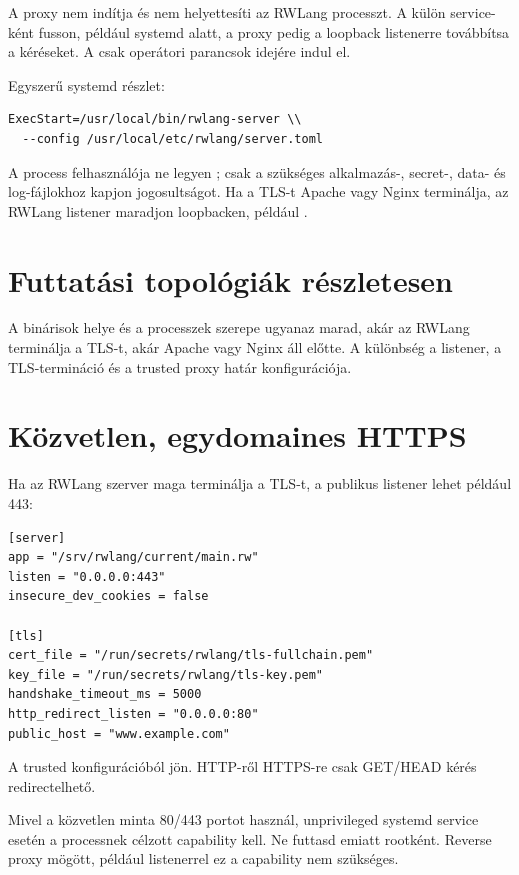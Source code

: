 A proxy nem indítja és nem helyettesíti az RWLang processzt. A  külön service-ként fusson, például systemd alatt, a proxy pedig a loopback listenerre továbbítsa a kéréseket. A  csak operátori parancsok idejére indul el.

Egyszerű systemd  részlet:

\begin{lstlisting}
ExecStart=/usr/local/bin/rwlang-server \\
  --config /usr/local/etc/rwlang/server.toml
\end{lstlisting}

A process felhasználója ne legyen ; csak a szükséges alkalmazás-, secret-, data- és log-fájlokhoz kapjon jogosultságot. Ha a TLS-t Apache vagy Nginx terminálja, az RWLang listener maradjon loopbacken, például .

\section{Futtatási topológiák részletesen}

A binárisok helye és a processzek szerepe ugyanaz marad, akár az RWLang terminálja a TLS-t, akár Apache vagy Nginx áll előtte. A különbség a listener, a TLS-termináció és a trusted proxy határ konfigurációja.

\section{Közvetlen, egydomaines HTTPS}

Ha az RWLang szerver maga terminálja a TLS-t, a publikus listener lehet például 443:

\begin{lstlisting}
[server]
app = "/srv/rwlang/current/main.rw"
listen = "0.0.0.0:443"
insecure_dev_cookies = false

[tls]
cert_file = "/run/secrets/rwlang/tls-fullchain.pem"
key_file = "/run/secrets/rwlang/tls-key.pem"
handshake_timeout_ms = 5000
http_redirect_listen = "0.0.0.0:80"
public_host = "www.example.com"
\end{lstlisting}

A  trusted konfigurációból jön. HTTP-ről HTTPS-re csak GET/HEAD kérés redirectelhető.

Mivel a közvetlen minta 80/443 portot használ, unprivileged systemd service esetén a processnek célzott  capability kell. Ne futtasd emiatt rootként. Reverse proxy mögött, például  listenerrel ez a capability nem szükséges.


